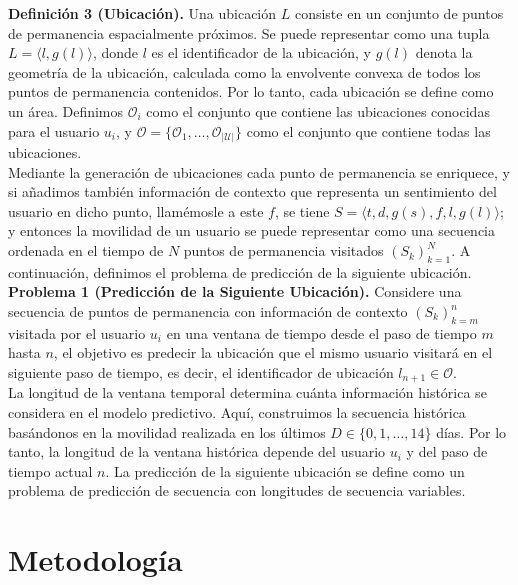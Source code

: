 \textbf{Definición 3 (Ubicación).} Una ubicación $L$ consiste en 
un conjunto de puntos de permanencia espacialmente próximos. Se 
puede representar como una tupla $L = \langle l, g(l) \rangle$, 
donde $l$ es el identificador de la ubicación, 
y $g(l)$ denota la geometría de la ubicación, calculada como la 
envolvente convexa de todos los puntos de permanencia contenidos. 
Por lo tanto, cada ubicación se define como un área. 
Definimos $\mathcal{O}_i$ como el conjunto que contiene las 
ubicaciones conocidas para el usuario $u_i$, y 
$\mathcal{O} = \{\mathcal{O}_1, \dots, \mathcal{O}_{|\mathcal{U}|} \}$ 
como el conjunto que contiene todas las ubicaciones.\\


Mediante la generación de ubicaciones cada punto de permanencia 
se enriquece, y si añadimos tambi\'en información de contexto que 
representa un sentimiento del usuario en dicho punto, llam\'emosle a este $f$, se tiene
$S = \langle t, d, g(s), f, l, g(l) \rangle$; y entonces la movilidad de 
un usuario se puede representar como una secuencia ordenada en 
el tiempo de $N$ puntos de permanencia visitados $(S_k)_{k=1}^N$.
A continuación, definimos el problema de predicción de la 
siguiente ubicación.\\

\textbf{Problema 1 (Predicción de la Siguiente Ubicación).} 
Considere una secuencia de puntos de permanencia con información 
de contexto $(S_k)_{k=m}^n$ visitada por el usuario $u_i$ en una 
ventana de tiempo desde el paso de tiempo $m$ hasta $n$, el 
objetivo es predecir la ubicación que el mismo usuario visitará 
en el siguiente paso de tiempo, es decir, el identificador de 
ubicación $l_{n+1} \in \mathcal{O}$.\\

La longitud de la ventana temporal determina cuánta información 
histórica se considera en el modelo predictivo. Aquí, construimos 
la secuencia histórica basándonos en la movilidad realizada en 
los últimos \(D \in \{0, 1, \dots, 14\}\) días.
Por lo tanto, la longitud de la ventana histórica depende del 
usuario \(u_i\) y del paso de tiempo actual \(n\). 
La predicción de la siguiente ubicación se define como un 
problema de predicción de secuencia con longitudes de secuencia 
variables.
\newpage
\section{Metodolog\'ia}

